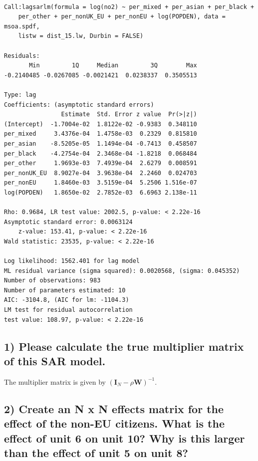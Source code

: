 \documentclass[
  letterpaper,
]{scrbook}
\begin{document}
\begin{verbatim}

Call:lagsarlm(formula = log(no2) ~ per_mixed + per_asian + per_black + 
    per_other + per_nonUK_EU + per_nonEU + log(POPDEN), data = msoa.spdf, 
    listw = dist_15.lw, Durbin = FALSE)

Residuals:
       Min         1Q     Median         3Q        Max 
-0.2140485 -0.0267085 -0.0021421  0.0238337  0.3505513 

Type: lag 
Coefficients: (asymptotic standard errors) 
                Estimate  Std. Error z value  Pr(>|z|)
(Intercept)  -1.7004e-02  1.8122e-02 -0.9383  0.348110
per_mixed     3.4376e-04  1.4758e-03  0.2329  0.815810
per_asian    -8.5205e-05  1.1494e-04 -0.7413  0.458507
per_black    -4.2754e-04  2.3468e-04 -1.8218  0.068484
per_other     1.9693e-03  7.4939e-04  2.6279  0.008591
per_nonUK_EU  8.9027e-04  3.9638e-04  2.2460  0.024703
per_nonEU     1.8460e-03  3.5159e-04  5.2506 1.516e-07
log(POPDEN)   1.8650e-02  2.7852e-03  6.6963 2.138e-11

Rho: 0.9684, LR test value: 2002.5, p-value: < 2.22e-16
Asymptotic standard error: 0.0063124
    z-value: 153.41, p-value: < 2.22e-16
Wald statistic: 23535, p-value: < 2.22e-16

Log likelihood: 1562.401 for lag model
ML residual variance (sigma squared): 0.0020568, (sigma: 0.045352)
Number of observations: 983 
Number of parameters estimated: 10 
AIC: -3104.8, (AIC for lm: -1104.3)
LM test for residual autocorrelation
test value: 108.97, p-value: < 2.22e-16
\end{verbatim}

\hypertarget{please-calculate-the-true-multiplier-matrix-of-this-sar-model.}{%
\subsection*{1) Please calculate the true multiplier matrix of this SAR
model.}\label{please-calculate-the-true-multiplier-matrix-of-this-sar-model.}}

The multiplier matrix is given by
\(({\boldsymbol{\mathbf{I}}_N}- \rho {\boldsymbol{\mathbf{W}}})^{-1}\).

\hypertarget{create-an-n-x-n-effects-matrix-for-the-effect-of-the-non-eu-citizens.-what-is-the-effect-of-unit-6-on-unit-10-why-is-this-larger-than-the-effect-of-unit-5-on-unit-8}{%
\subsection*{2) Create an N x N effects matrix for the effect of the
non-EU citizens. What is the effect of unit 6 on unit 10? Why is this
larger than the effect of unit 5 on unit
8?}\label{create-an-n-x-n-effects-matrix-for-the-effect-of-the-non-eu-citizens.-what-is-the-effect-of-unit-6-on-unit-10-why-is-this-larger-than-the-effect-of-unit-5-on-unit-8}}
\end{document}
